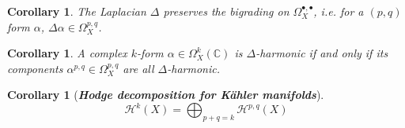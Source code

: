 \documentclass[psamsfonts, 12pt]{amsart}
\newtheorem{cor}[thm]{Corollary}
\theoremstyle{definition}
\theoremstyle{remark}
\newcommand{\ib}[1]{\textbf{\textit{#1}}}
\newcommand{\C}{\mathbb{C}}
\begin{document}
%
\begin{cor}
The Laplacian $\Delta$ preserves the bigrading on $\Omega_X^{\bullet,\bullet}$,
i.e. for a $(p,q)$ form $\alpha$, $\Delta\alpha \in \Omega_X^{p,q}$.
\end{cor}
%
\begin{cor}
A complex $k$-form $\alpha \in \Omega^k_X(\C)$ is $\Delta$-harmonic if and only if
its components $\alpha^{p,q} \in \Omega^{p,q}_X$ are all $\Delta$-harmonic.
\end{cor}
%
\begin{cor}[\ib{Hodge decomposition for K\"ahler manifolds}]
\[
\mathcal{H}^k(X) = \bigoplus_{p+q=k}\mathcal{H}^{p,q}(X)
\]
\end{cor}
%
\end{document}
